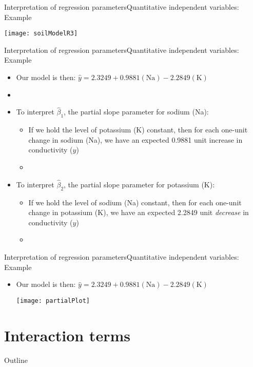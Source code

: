\documentclass[xcolor=dvipsnames]{beamer}
\begin{document}
\begin{frame}{Interpretation of regression parameters}{Quantitative independent variables: Example}
	\begin{center}
		\texttt{[image: soilModelR3]}
	\end{center}
\end{frame}

\begin{frame}{Interpretation of regression parameters}{Quantitative independent variables: Example}
	\begin{itemize}
		\item Our model is then: $\hat{y} = 2.3249 + 0.9881(\text{Na}) - 2.2849(\text{K})$
		\item[]
		\item To interpret $\hat{\beta}_1$, the partial slope parameter for sodium (Na):
		\begin{itemize}
			\item If we hold the level of potassium (K) constant, then for each one-unit change in sodium (Na), we have an expected 0.9881 unit increase in conductivity ($y$)
			\item[]
		\end{itemize}
			\item To interpret $\hat{\beta}_2$, the partial slope parameter for potassium (K):
	\begin{itemize}
		\item If we hold the level of sodium (Na) constant, then for each one-unit change in potassium (K), we have an expected 2.2849 unit \emph{decrease} in conductivity ($y$)
		\item[]
	\end{itemize}
	\end{itemize}
\end{frame}

\begin{frame}{Interpretation of regression parameters}{Quantitative independent variables: Example}
	\begin{itemize}
		\item Our model is then: $\hat{y} = 2.3249 + 0.9881(\text{Na}) - 2.2849(\text{K})$
		\begin{center}
			\texttt{[image: partialPlot]}
		\end{center}
	\end{itemize}
\end{frame}

\section{Interaction terms}
\begin{frame}{Outline}
	\tableofcontents[currentsection,subsectionstyle=show/shaded/hide]
\end{frame}
\end{document}
